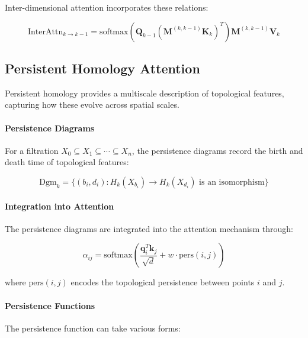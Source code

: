 Inter-dimensional attention incorporates these relations:

\begin{equation}
\text{InterAttn}_{k \to k-1} = \text{softmax}(\mathbf{Q}_{k-1} (\mathbf{M}^{(k,k-1)} \mathbf{K}_k)^T) \mathbf{M}^{(k,k-1)} \mathbf{V}_k
\label{eq:inter_dimensional_attention}
\end{equation}

\subsection{Persistent Homology Attention}

Persistent homology provides a multiscale description of topological features, capturing how these evolve across spatial scales.

\paragraph{Persistence Diagrams}

For a filtration $X_0 \subseteq X_1 \subseteq \cdots \subseteq X_n$, the persistence diagrams record the birth and death time of topological features:

\begin{equation}
\text{Dgm}_k = \{(b_i, d_i) : H_k(X_{b_i}) \to H_k(X_{d_i}) \text{ is an isomorphism}\}
\label{eq:persistence_diagram}
\end{equation}

\paragraph{Integration into Attention}

The persistence diagrams are integrated into the attention mechanism through:

\begin{equation}
\alpha_{ij} = \text{softmax}\left(\frac{\mathbf{q}_i^T \mathbf{k}_j}{\sqrt{d}} + w \cdot \text{pers}(i,j)\right)
\label{eq:persistent_attention_weights}
\end{equation}

where $\text{pers}(i,j)$ encodes the topological persistence between points $i$ and $j$.

\paragraph{Persistence Functions}

The persistence function can take various forms:

